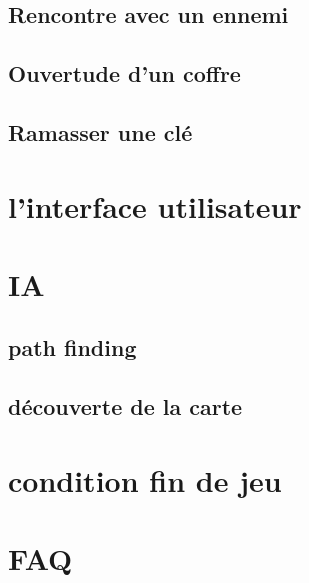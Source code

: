 \documentclass[a4paper 12pts]{article}
\begin{document}
\subsection {Rencontre avec un ennemi} 
\subsection {Ouvertude d'un coffre}
\subsection {Ramasser une clé}


\section{l'interface utilisateur}

\section{IA}

\subsection{path finding}

\subsection{découverte de la carte}

\section{condition fin de jeu}

\section {FAQ}
\end{document}
